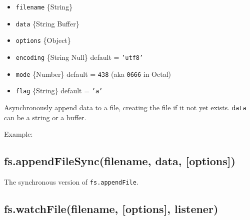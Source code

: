 \begin{itemize}
\item
  \texttt{filename} \{String\}
\item
  \texttt{data} \{String \textbar{} Buffer\}
\item
  \texttt{options} \{Object\}
\item
  \texttt{encoding} \{String \textbar{} Null\} default = \texttt{'utf8'}
\item
  \texttt{mode} \{Number\} default = \texttt{438} (aka \texttt{0666} in
  Octal)
\item
  \texttt{flag} \{String\} default = \texttt{'a'}
\end{itemize}

Asynchronously append data to a file, creating the file if it not yet
exists. \texttt{data} can be a string or a buffer.

Example:

\begin{Shaded}
\begin{Highlighting}[]
\NormalTok{(}\NormalTok{, }\NormalTok{, } 
    
  \NormalTok{(}\NormalTok{);}
\NormalTok{\});}
\end{Highlighting}
\end{Shaded}

\subsection{fs.appendFileSync(filename, data, {[}options{]})}

The synchronous version of \texttt{fs.appendFile}.

\subsection{fs.watchFile(filename, {[}options{]}, listener)}

\begin{Shaded}
\begin{Highlighting}[]
\NormalTok{: } \NormalTok{- }  
\end{Highlighting}
\end{Shaded}

